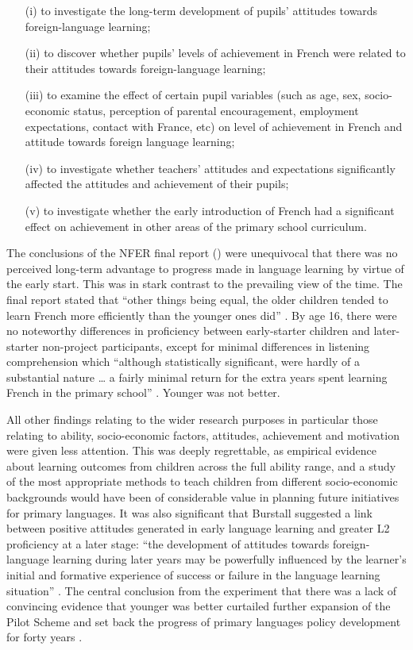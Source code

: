 \documentclass[output=paper]{langscibook}
\begin{document}
\begin{enumerate}\sloppy
\item[(i)] to investigate the long-term development of pupils’ attitudes towards foreign-language learning;
\item[(ii)] to discover whether pupils’ levels of achievement in French were related to their attitudes towards foreign-language learning;
\item[(iii)] to examine the effect of certain pupil variables (such as age, sex, socio-economic status, perception of parental encouragement, employment expectations, contact with France, etc) on level of achievement in French and attitude towards foreign language learning;
\item[(iv)] to investigate whether teachers’ attitudes and expectations significantly affected the attitudes and achievement of their pupils;
\item[(v)] to investigate whether the early introduction of French had a significant effect on achievement in other areas of the primary school curriculum. \citep{Burstall1975}
\end{enumerate}

The conclusions of the NFER final report (\citeyear{Burstall1977}) were unequivocal that there was no perceived long-term advantage to progress made in language learning by virtue of the early start. This was in stark contrast to the prevailing view of the time. The final report stated that ``other things being equal, the older children tended to learn French more efficiently than the younger ones did'' \citep[247f.]{Burstall1977}. By age 16, there were no noteworthy differences in proficiency between early-starter children and later-starter non-project participants, except for minimal differences in listening comprehension which ``although statistically significant, were hardly of a substantial nature … a fairly minimal return for the extra years spent learning French in the primary school'' \citep[248]{Burstall1977}. Younger was not better. 

All other findings relating to the wider research purposes in particular those relating to ability, socio-economic factors, attitudes, achievement and motivation were given less attention. This was deeply regrettable, as empirical evidence about learning outcomes from children across the full ability range, and a study of the most appropriate methods to teach children from different socio-economic backgrounds would have been of considerable value in planning future initiatives for primary languages. It was also significant that Burstall suggested a link between positive attitudes generated in early language learning and greater L2 proficiency at a later stage: ``the development of attitudes towards foreign-language learning during later years may be powerfully influenced by the learner’s initial and formative experience of success or failure in the language learning situation'' \citep[235]{BurstallEtAl1974}. The central conclusion from the experiment that there was a lack of convincing evidence that younger was better curtailed further expansion of the Pilot Scheme and set back the progress of primary languages policy development for forty years \citep{Tellier2019}. 
\end{document}
